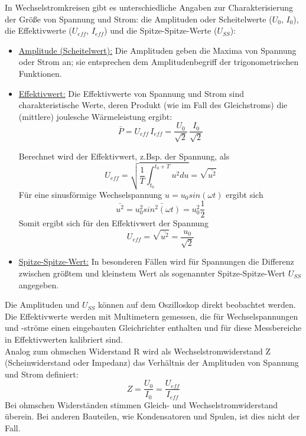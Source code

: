 \noindent
In Wechselstromkreisen gibt es unterschiedliche Angaben zur Charakterisierung der Größe von Spannung und Strom: die Amplituden oder Scheitelwerte ($U_0$, $I_0$), die Effektivwerte ($U_{eff}$, $I_{eff}$) und die Spitze-Spitze-Werte ($U_{SS}$):
\begin{itemize}
 \item \underline{Amplitude (Scheitelwert):} Die Amplituden geben die Maxima von Spannung oder Strom an; sie entsprechen dem Amplitudenbegriff der trigonometrischen Funktionen.
 \item \underline{Effektivwert:} Die Effektivwerte von Spannung und Strom sind charakteristische Werte, deren Produkt (wie im Fall des Gleichstroms) die (mittlere) joulesche Wärmeleistung ergibt:
  \begin{equation}
   \bar{P} = U_{eff}\, I_{eff} = \frac{U_0}{\sqrt{2}}\,\frac{I_0}{\sqrt{2}}
  \end{equation}
	\begin{hint}
		Berechnet wird der Effektivwert, z.Bsp. der Spannung, als 
		\begin{equation*}
			U_{eff} = \sqrt{\frac{1}{T} \int_{t_0}^{t_0 +T}{u^2 du}} = \sqrt{\bar{u^2}}
		\end{equation*}
		Für eine sinusförmige Wechselspannung $u=u_0 sin(\omega t)$ ergibt sich
		\begin{equation*}
			\bar{u^2} = u_0^2 \bar{sin^2(\omega t)} = u_0^2\frac{1}{2}
		\end{equation*}
		Somit ergibt sich für den Effektivwert der Spannung
		\begin{equation} \label{eq:Effektivspannung}
			U_{eff} = \sqrt{\bar{u^2}} = \frac{u_0}{\sqrt{2}}
		\end{equation}
	\end{hint}
 \item \underline{Spitze-Spitze-Wert:} In besonderen Fällen wird für Spannungen die Differenz zwischen größtem und kleinstem Wert als sogenannter Spitze-Spitze-Wert $U_{SS}$ angegeben.
\end{itemize}

Die Amplituden und $U_{SS}$ können auf dem Oszilloskop direkt beobachtet werden. Die Effektivwerte werden mit Multimetern gemessen, die für Wechselspannungen und -ströme einen eingebauten Gleichrichter enthalten und für diese Messbereiche in Effektivwerten kalibriert sind.\\

Analog zum ohmschen Widerstand R wird als Wechselstromwiderstand Z (Scheinwiderstand oder Impedanz) das Verhältnis der Amplituden von Spannung und Strom definiert:
\begin{equation}
 Z = \frac{U_0}{I_0} = \frac{U_{eff}}{I_{eff}}
 \label{eq:Z}
\end{equation}
Bei ohmschen Widerständen stimmen Gleich- und Wechselstromwiderstand überein. Bei anderen Bauteilen, wie Kondensatoren und Spulen, ist dies nicht der Fall.

